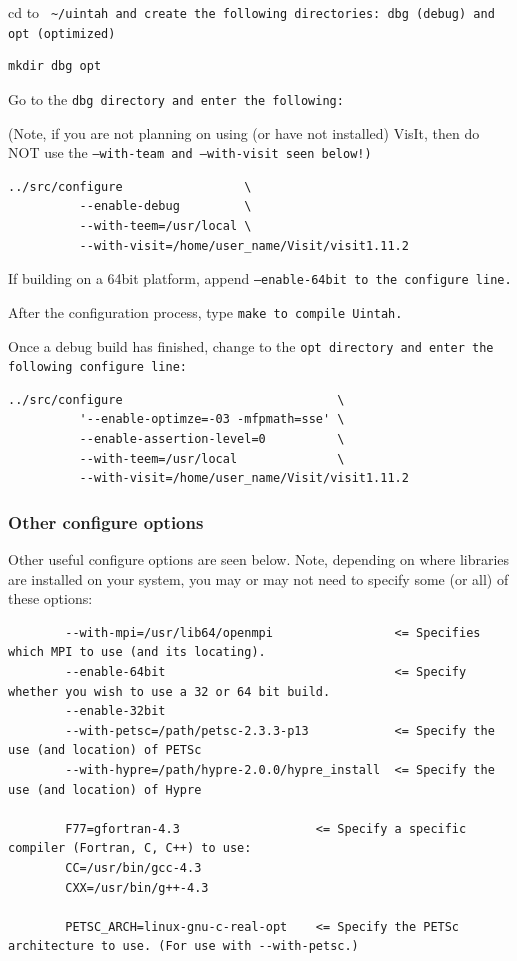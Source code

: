 \documentclass[12pt]{article}
\newcommand{\TT}[1]{\tt{#1} \normalfont}
\begin{document}
cd to \TT{ \textasciitilde/uintah} and create the following directories:
\TT{dbg} (debug) and \TT{opt} (optimized)

\begin{verbatim}
mkdir dbg opt
\end{verbatim}

Go to the \TT{dbg} directory and enter the following:

(Note, if you are not planning on using (or have not installed) VisIt,
then do NOT use the \TT{--with-team} and \TT{--with-visit} seen below!)

\begin{verbatim}
../src/configure                 \
          --enable-debug         \
          --with-teem=/usr/local \
          --with-visit=/home/user_name/Visit/visit1.11.2
\end{verbatim}

If building on a 64bit platform, append \TT{--enable-64bit} to the configure line.

After the configuration process, type \TT{make} to compile Uintah.

Once a debug build has finished, change to the \TT{opt} directory and enter
the following configure line:

\begin{verbatim}
../src/configure                              \
          '--enable-optimze=-03 -mfpmath=sse' \
          --enable-assertion-level=0          \
          --with-teem=/usr/local              \
          --with-visit=/home/user_name/Visit/visit1.11.2
\end{verbatim}

\subsubsection{Other configure options}

Other useful configure options are seen below.  Note, depending on
where libraries are installed on your system, you may or may not need
to specify some (or all) of these options:

\begin{verbatim}
        --with-mpi=/usr/lib64/openmpi                 <= Specifies which MPI to use (and its locating).
        --enable-64bit                                <= Specify whether you wish to use a 32 or 64 bit build.
        --enable-32bit
        --with-petsc=/path/petsc-2.3.3-p13            <= Specify the use (and location) of PETSc
        --with-hypre=/path/hypre-2.0.0/hypre_install  <= Specify the use (and location) of Hypre

        F77=gfortran-4.3                   <= Specify a specific compiler (Fortran, C, C++) to use:
        CC=/usr/bin/gcc-4.3
        CXX=/usr/bin/g++-4.3

        PETSC_ARCH=linux-gnu-c-real-opt    <= Specify the PETSc architecture to use. (For use with --with-petsc.)
\end{verbatim}
\end{document}
